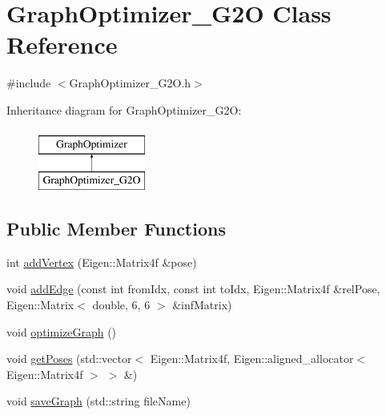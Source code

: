 \hypertarget{class_graph_optimizer___g2_o}{
\section{GraphOptimizer\_\-G2O Class Reference}
\label{class_graph_optimizer___g2_o}
}


{\ttfamily \#include $<$GraphOptimizer\_\-G2O.h$>$}

Inheritance diagram for GraphOptimizer\_\-G2O:\begin{figure}[H]
\begin{center}
\leavevmode
\includegraphics[height=2.000000cm]{class_graph_optimizer___g2_o}
\end{center}
\end{figure}
\subsection*{Public Member Functions}
\begin{DoxyCompactItemize}
\item 
int \hyperlink{class_graph_optimizer___g2_o_ad1c9376f78767de3063170221e43859a}{addVertex} (Eigen::Matrix4f \&pose)
\item 
void \hyperlink{class_graph_optimizer___g2_o_a53c3edc42e43fef29e4a945141654391}{addEdge} (const int fromIdx, const int toIdx, Eigen::Matrix4f \&relPose, Eigen::Matrix$<$ double, 6, 6 $>$ \&infMatrix)
\item 
void \hyperlink{class_graph_optimizer___g2_o_a78dac310c50fdd61bcbcc64855fe6565}{optimizeGraph} ()
\item 
void \hyperlink{class_graph_optimizer___g2_o_ad30f6cd46b424482a7b26e41fb442f50}{getPoses} (std::vector$<$ Eigen::Matrix4f, Eigen::aligned\_\-allocator$<$ Eigen::Matrix4f $>$ $>$ \&)
\item 
void \hyperlink{class_graph_optimizer___g2_o_ae0aff0bbd454803fb4a32fc5bdae1a2a}{saveGraph} (std::string fileName)
\end{DoxyCompactItemize}
